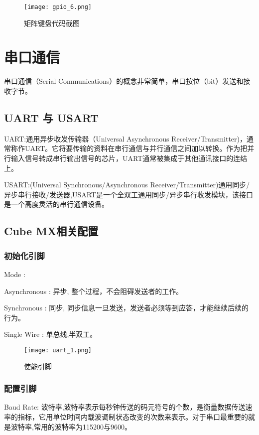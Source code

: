 \documentclass[cn,11pt]{elegantbook}
\begin{document}
\begin{figure}[htbp]
	\centering
	\texttt{[image: gpio\_6.png]}
	\caption{矩阵键盘代码截图\label{fig:scatter}}
\end{figure}

\section{串口通信}

串口通信（Serial Communications）的概念非常简单，串口按位（bit）发送和接收字节。

\subsection{UART 与 USART}

UART:通用异步收发传输器（Universal Asynchronous Receiver/Transmitter)，通常称作UART。它将要传输的资料在串行通信与并行通信之间加以转换。作为把并行输入信号转成串行输出信号的芯片，UART通常被集成于其他通讯接口的连结上。

USART:(Universal Synchronous/Asynchronous Receiver/Transmitter)通用同步/异步串行接收/发送器,USART是一个全双工通用同步/异步串行收发模块，该接口是一个高度灵活的串行通信设备。
\subsection{Cube MX相关配置}

\subsubsection{初始化引脚}

Mode : 

Asynchronous : 异步, 整个过程，不会阻碍发送者的工作。

Synchronous : 同步, 同步信息一旦发送，发送者必须等到应答，才能继续后续的行为。

Single Wire : 单总线,半双工。

\begin{figure}[htbp]
	\centering
	\texttt{[image: uart\_1.png]}
	\caption{使能引脚\label{fig:scatter}}
\end{figure}

\subsubsection{配置引脚}

Baud Rate: 波特率,波特率表示每秒钟传送的码元符号的个数，是衡量数据传送速率的指标，它用单位时间内载波调制状态改变的次数来表示。对于串口最重要的就是波特率,常用的波特率为115200与9600。
\end{document}
